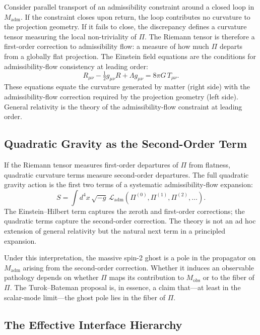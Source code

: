 \documentclass[12pt,a4paper]{article}
\theoremstyle{remark}
\begin{document}
Consider parallel transport of an admissibility constraint around a
closed loop in $M_{\mathrm{adm}}$. If the constraint closes upon
return, the loop contributes no curvature to the projection geometry.
If it fails to close, the discrepancy defines a curvature tensor
measuring the local non-triviality of $\Pi$. The Riemann tensor is
therefore a first-order correction to admissibility flow: a measure of
how much $\Pi$ departs from a globally flat projection. The Einstein
field equations are the conditions for admissibility-flow consistency
at leading order:
\begin{equation}
  R_{\mu\nu} - \tfrac{1}{2}g_{\mu\nu}R + \Lambda g_{\mu\nu}
  = 8\pi G\,T_{\mu\nu}.
\end{equation}
These equations equate the curvature generated by matter (right side)
with the admissibility-flow correction required by the projection geometry
(left side). General relativity is the theory of the admissibility-flow
constraint at leading order.

\subsection{Quadratic Gravity as the Second-Order Term}

If the Riemann tensor measures first-order departures of $\Pi$ from
flatness, quadratic curvature terms measure second-order departures. The
full quadratic gravity action is the first two terms of a systematic
admissibility-flow expansion:
\begin{equation}
  S = \int d^4x\,\sqrt{-g}\,
    \mathcal{L}_{\mathrm{adm}}\!\left(\Pi^{(0)}, \Pi^{(1)}, \Pi^{(2)}, \ldots\right).
\end{equation}
The Einstein--Hilbert term captures the zeroth and first-order corrections;
the quadratic terms capture the second-order correction. The theory is not
an ad hoc extension of general relativity but the natural next term in a
principled expansion.

Under this interpretation, the massive spin-2 ghost is a pole in the
propagator on $M_{\mathrm{adm}}$ arising from the second-order correction.
Whether it induces an observable pathology depends on whether $\Pi$ maps
its contribution to $M_{\mathrm{obs}}$ or to the fiber of $\Pi$. The
Turok--Bateman proposal is, in essence, a claim that---at least in the
scalar-mode limit---the ghost pole lies in the fiber of $\Pi$.

\subsection{The Effective Interface Hierarchy}
\end{document}
